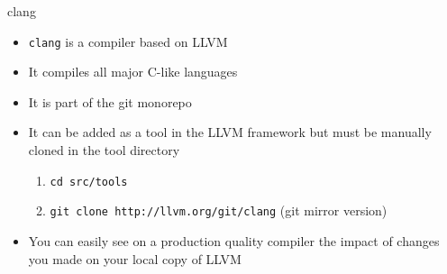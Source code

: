 \begin{frame}{clang}
\begin{itemize}
	\item \texttt{clang} is a compiler based on LLVM
	\item It compiles all major C-like languages
	\vfill
	\item It is part of the git monorepo
	\item It can be added as a tool in the LLVM framework but must be manually cloned in the tool directory
	\begin{enumerate}
		\item \texttt{cd src/tools}
		\item \texttt{git clone http://llvm.org/git/clang} (git mirror version)
	\end{enumerate}
	\vfill
	\item You can easily see on a production quality compiler the impact of changes you made on your local copy of LLVM
\end{itemize}
\end{frame}
